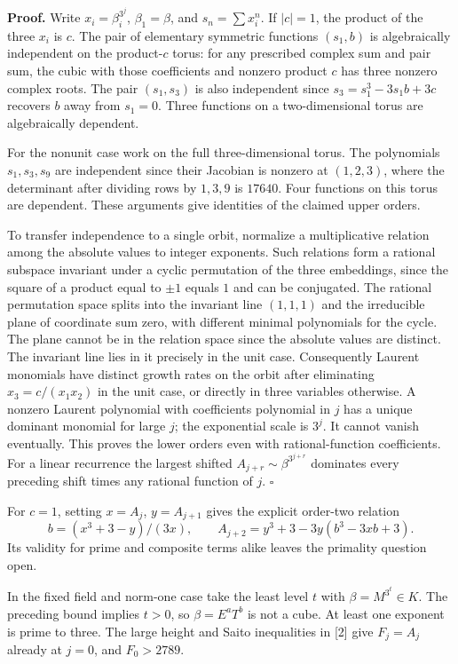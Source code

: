 \documentclass[11pt,a4paper,oneside,openany]{book}
\begin{document}
\textbf{Proof.} Write $x_i=\beta_i^{3^j}$, $\beta_1=\beta$, and $s_n=\sum x_i^n$. If $|c|=1$, the product of the three $x_i$ is $c$. The pair of elementary symmetric functions $(s_1,b)$ is algebraically independent on the product-$c$ torus: for any prescribed complex sum and pair sum, the cubic with those coefficients and nonzero product $c$ has three nonzero complex roots. The pair $(s_1,s_3)$ is also independent since $s_3=s_1^3-3s_1 b+3c$ recovers $b$ away from $s_1=0$. Three functions on a two-dimensional torus are algebraically dependent.

For the nonunit case work on the full three-dimensional torus. The polynomials $s_1,s_3,s_9$ are independent since their Jacobian is nonzero at $(1,2,3)$, where the determinant after dividing rows by $1,3,9$ is $17640$. Four functions on this torus are dependent. These arguments give identities of the claimed upper orders.

To transfer independence to a single orbit, normalize a multiplicative relation among the absolute values to integer exponents. Such relations form a rational subspace invariant under a cyclic permutation of the three embeddings, since the square of a product equal to $\pm1$ equals $1$ and can be conjugated. The rational permutation space splits into the invariant line $(1,1,1)$ and the irreducible plane of coordinate sum zero, with different minimal polynomials for the cycle. The plane cannot be in the relation space since the absolute values are distinct. The invariant line lies in it precisely in the unit case. Consequently Laurent monomials have distinct growth rates on the orbit after eliminating $x_3=c/(x_1x_2)$ in the unit case, or directly in three variables otherwise. A nonzero Laurent polynomial with coefficients polynomial in $j$ has a unique dominant monomial for large $j$; the exponential scale is $3^j$. It cannot vanish eventually. This proves the lower orders even with rational-function coefficients. For a linear recurrence the largest shifted $A_{j+r}\sim\beta^{3^{j+r}}$ dominates every preceding shift times any rational function of $j$. \hfill$\square$

For $c=1$, setting $x=A_j$, $y=A_{j+1}$ gives the explicit order-two relation
\[
 b=(x^3+3-y)/(3x),\qquad A_{j+2}=y^3+3-3y(b^3-3xb+3).
\]
Its validity for prime and composite terms alike leaves the primality question open.


In the fixed field and norm-one case take the least level $t$ with $\beta=M^{3^t}\in K$. The preceding bound implies $t>0$, so $\beta=E^aT^b$ is not a cube. At least one exponent is prime to three. The large height and Saito inequalities in [2] give $F_j=A_j$ already at $j=0$, and $F_0>2789$.
\end{document}
